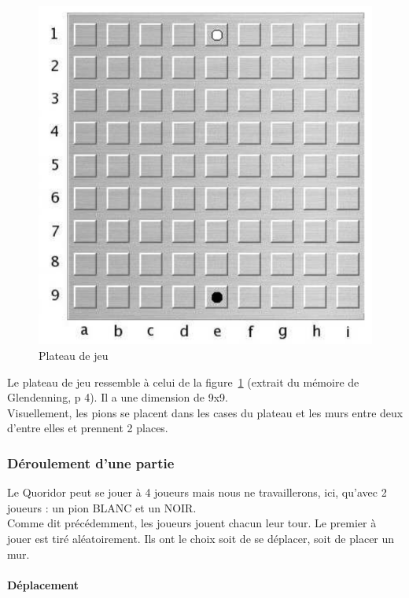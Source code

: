 \documentclass[12pt,a4paper]{article}
\begin{document}
\begin{figure}[h]
  \begin{center}
    \includegraphics[scale=0.5]{blankBoard}
    \caption{Plateau de jeu }
    \label{blankBoard}
  \end{center}
\end{figure}

Le plateau de jeu ressemble  à celui de la figure~\ref{blankBoard} (extrait du 
mémoire de Glendenning, p 4). Il a une dimension de 9x9.
\\
Visuellement, les pions se placent dans les cases du plateau et les murs \og entre
deux d'entre elles \fg{} et prennent 2 places.

\subsubsection{Déroulement d'une partie}

Le Quoridor peut se jouer à 4 joueurs mais nous ne travaillerons, ici, qu'avec 2 
joueurs : un pion BLANC et un NOIR.
\\

Comme dit précédemment, les joueurs jouent chacun leur tour. Le premier à jouer est tiré 
aléatoirement. Ils ont le choix soit de se déplacer, soit de placer un mur.

\paragraph{Déplacement \\ \\}
\end{document}
